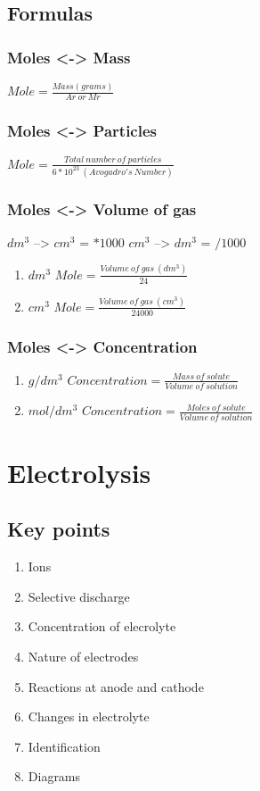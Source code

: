 \documentclass[11pt]{article}
\begin{document}
\subsection{Formulas}
\label{sec:orgd7958e2}
\subsubsection{Moles <-> Mass}
\label{sec:orgb77735e}
\(Mole = \frac{Mass(grams)}{Ar\ or\ Mr}\)
\subsubsection{Moles <-> Particles}
\label{sec:org9212ceb}
\(Mole = \frac{Total\ number\ of\ particles}{6*10^{23}\ (Avogadro's\ Number)}\)
\subsubsection{Moles <-> Volume of gas}
\label{sec:org839b506}
\(dm^3\) --> \(cm^3\) = \(*1000\)
\(cm^3\) --> \(dm^3\) = \(/1000\)
\begin{enumerate}
\item \(dm^3\)
\label{sec:org99dd7f8}
\(Mole = \frac{Volume\ of\ gas\ (dm^3)}{24}\)
\item \(cm^3\)
\label{sec:org878e299}
\(Mole = \frac{Volume\ of\ gas\ (cm^3)}{24000}\)
\end{enumerate}
\subsubsection{Moles <-> Concentration}
\label{sec:orgec79905}
\begin{enumerate}
\item \(g/dm^3\)
\label{sec:org6aa05f4}
\(Concentration = \frac{Mass\ of\ solute}{Volume\ of\ solution}\)
\item \(mol/dm^3\)
\label{sec:orga3f03bf}
\(Concentration = \frac{Moles\ of\ solute}{Volume\ of\ solution}\)
\end{enumerate}
\section{Electrolysis}
\label{sec:org692cfc0}
\subsection{Key points}
\label{sec:org932c055}
\begin{enumerate}
\item Ions
\item Selective discharge
\item Concentration of elecrolyte
\item Nature of electrodes
\item Reactions at anode and cathode
\item Changes in electrolyte
\item Identification
\item Diagrams
\end{enumerate}
\end{document}

